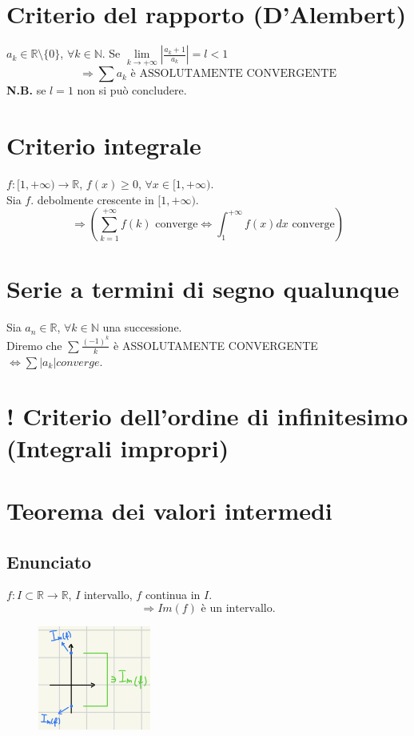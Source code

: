 \documentclass{article}
\newcommand{\R}{\mathbb{R}}
\newcommand{\N}{\mathbb{N}}
\begin{document}
\begin{flushleft}
\section{Criterio del rapporto (D'Alembert)}
$a_k \in \R \setminus \{0\}$, $\forall k \in \N$. Se $\lim\limits_{k \to + \infty} \left|\frac{a_k+1}{a_k}\right| = l < 1$
\[
\Rightarrow \sum a_k \text{ è ASSOLUTAMENTE CONVERGENTE}
\]
\textbf{N.B.} se $l=1$ non si può concludere.

\section{Criterio integrale}
$f:[1, +\infty) \rightarrow \R$, $f(x) \geq 0$, $\forall x \in [1, +\infty)$.\\
Sia $f$. debolmente crescente in $[1, + \infty)$.
\[
\Rightarrow (\sum_{k = 1}^{+ \infty}f(k) \text{ converge} \iff \int_{1}^{+ \infty}f(x)dx \text{ converge})
\]

\section{Serie a termini di segno qualunque}
Sia $a_n \in \R$, $\forall k \in \N$ una successione.\\
Diremo che $\sum \frac{(-1)^k}{k}$ è ASSOLUTAMENTE CONVERGENTE $\iff \sum \left|a_k\right| converge$.

\section{! Criterio dell'ordine di infinitesimo (Integrali impropri)}
\section{Teorema dei valori intermedi}
\subsection{Enunciato}
$f: I \subset \R \rightarrow \R$, $I$ intervallo, $f$ continua in $I$.
\[
\Rightarrow Im(f) \text{ è un intervallo.}
\]
\begin{figure}[h]
    \centering
    \includegraphics[width=10em]{./images/valori_intermedi.jpg}
\end{figure}
\FloatBarrier


\end{flushleft}
\end{document}

